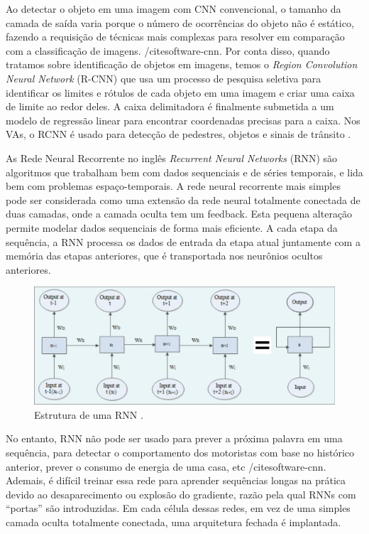 Ao detectar o objeto em uma imagem com CNN convencional, o tamanho da camada de saída varia porque o número de ocorrências do objeto não é estático, fazendo a requisição de técnicas mais complexas para resolver em comparação com a classificação de imagens. /cite{software-cnn}.
Por conta disso, quando tratamos sobre identificação de objetos em imagens, temos o \textit{Region Convolution Neural Network} (R-CNN) que usa um processo de pesquisa seletiva para identificar os limites e rótulos de cada objeto em uma imagem e criar uma caixa de limite ao redor deles. A caixa delimitadora é finalmente submetida a um modelo de regressão linear para encontrar coordenadas precisas para a caixa. Nos VAs, o RCNN é usado para detecção de pedestres, objetos e sinais de trânsito \cite{review-auto}.



As Rede Neural Recorrente no inglês \textit{Recurrent Neural Networks} (RNN) são algoritmos que trabalham bem com dados sequenciais e de séries temporais, e lida bem com problemas espaço-temporais. A rede neural recorrente mais simples pode ser considerada como uma extensão da rede neural totalmente conectada de duas camadas, onde a camada oculta tem um feedback. Esta pequena alteração permite modelar dados sequenciais de forma mais eficiente. A cada etapa da sequência, a RNN processa os dados de entrada da etapa atual juntamente com a memória das etapas anteriores, que é transportada nos neurônios ocultos anteriores.

\begin{figure}[H]
\centering
\includegraphics[width=\textwidth]{Figures/RNN.png}
\caption{Estrutura de uma RNN \cite{software-cnn}.}
\label{RNN}
\end{figure}

No entanto, RNN não pode ser usado para prever a próxima palavra em uma sequência, para detectar o comportamento dos motoristas com base no histórico anterior, prever o consumo de energia de uma casa, etc /cite{software-cnn}. Ademais, é difícil treinar essa rede para aprender sequências longas na prática devido ao desaparecimento ou explosão do gradiente, razão pela qual RNNs com “portas” são introduzidas. Em cada célula dessas redes, em vez de uma simples camada oculta totalmente conectada, uma arquitetura fechada é implantada. 

